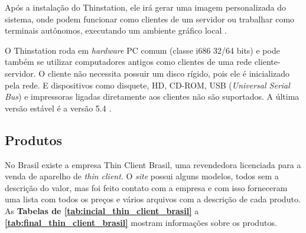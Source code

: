 \documentclass[
	12pt,				%
	openright,			%
	twoside,			%
	a4paper,			%
	chapter=TITLE,		%
	english,			%
	brazil				%
	]{abntex2}
\begin{document}
Após a instalação do Thinstation, ele irá gerar uma imagem personalizada do sistema, onde podem funcionar como clientes de um servidor ou trabalhar como terminais autônomos, executando um ambiente gráfico local \cite{Thinstationl}.

O Thinstation roda em \textit{hardware} PC comum (classe i686 32/64 bits) e pode também se utilizar computadores antigos como clientes de uma rede cliente-servidor. O cliente não necessita possuir um disco rígido, pois ele é inicializado pela rede. E dispositivos como disquete, HD, CD-ROM, USB (\textit{Universal Serial Bus}) e impressoras ligadas diretamente aos clientes não são suportados. A última versão estável é a versão 5.4 \cite{Thinstationl,piaui}.


\subsection{Produtos}

No Brasil existe a empresa Thin Client Brasil, uma revendedora licenciada para a venda de aparelho de \textit{thin client}. O \textit{site} possui alguns modelos, todos sem a descrição do valor, mas foi feito contato com a empresa e com isso forneceram uma lista com todos os preços e vários arquivos com a descrição de cada produto. As \textbf{Tabelas de \ref{tab:incial_thin_client_brasil}} a \textbf{\ref{tab:final_thin_client_brasil}} mostram informações sobre os produtos.

 

 \begin{table}
\end{table}
 
\end{document}
